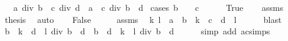 \begin{isabellebody}
\ \ \ {\isachardoublequoteopen}{\isacharparenleft}{\kern0pt}a\ div\ b{\isacharparenright}{\kern0pt}\ {\isacharasterisk}{\kern0pt}\ {\isacharparenleft}{\kern0pt}c\ div\ d{\isacharparenright}{\kern0pt}\ {\isacharequal}{\kern0pt}\ {\isacharparenleft}{\kern0pt}a\ {\isacharasterisk}{\kern0pt}\ c{\isacharparenright}{\kern0pt}\ div\ {\isacharparenleft}{\kern0pt}b\ {\isacharasterisk}{\kern0pt}\ d{\isacharparenright}{\kern0pt}{\isachardoublequoteclose}\isanewline
%
\isadelimproof
%
\endisadelimproof
%
\isatagproof
{}\isamarkupfalse%
\ {\isacharparenleft}{\kern0pt}cases\ {\isachardoublequoteopen}b\ {\isacharequal}{\kern0pt}\ {}\ {\isasymor}\ c\ {\isacharequal}{\kern0pt}\ {}{\isachardoublequoteclose}{\isacharparenright}{\kern0pt}\isanewline
\ \ \isamarkupfalse%
\ True\isanewline
\ \ \isamarkupfalse%
\ assms\ \isamarkupfalse%
\ {\isacharquery}{\kern0pt}thesis\ \isamarkupfalse%
\ auto\isanewline
{}\isamarkupfalse%
\isanewline
\ \ \isamarkupfalse%
\ False\isanewline
\ \ \isamarkupfalse%
\ \isamarkupfalse%
\ assms\ \isamarkupfalse%
\ k\ l\ \ {\isachardoublequoteopen}a\ {\isacharequal}{\kern0pt}\ b\ {\isacharasterisk}{\kern0pt}\ k{\isachardoublequoteclose}\ \ {\isachardoublequoteopen}c\ {\isacharequal}{\kern0pt}\ d\ {\isacharasterisk}{\kern0pt}\ l{\isachardoublequoteclose}\isanewline
\ \ \ \ \isamarkupfalse%
\ blast\isanewline
\ \ \isamarkupfalse%
\ \isamarkupfalse%
\ {\isachardoublequoteopen}b\ {\isacharasterisk}{\kern0pt}\ k\ {\isacharasterisk}{\kern0pt}\ {\isacharparenleft}{\kern0pt}d\ {\isacharasterisk}{\kern0pt}\ l{\isacharparenright}{\kern0pt}\ div\ {\isacharparenleft}{\kern0pt}b\ {\isacharasterisk}{\kern0pt}\ d{\isacharparenright}{\kern0pt}\ {\isacharequal}{\kern0pt}\ {\isacharparenleft}{\kern0pt}b\ {\isacharasterisk}{\kern0pt}\ d{\isacharparenright}{\kern0pt}\ {\isacharasterisk}{\kern0pt}\ {\isacharparenleft}{\kern0pt}k\ {\isacharasterisk}{\kern0pt}\ l{\isacharparenright}{\kern0pt}\ div\ {\isacharparenleft}{\kern0pt}b\ {\isacharasterisk}{\kern0pt}\ d{\isacharparenright}{\kern0pt}{\isachardoublequoteclose}\isanewline
\ \ \ \ \isamarkupfalse%
\ {\isacharparenleft}{\kern0pt}simp\ add{\isacharcolon}{\kern0pt}\ ac{\isacharunderscore}{\kern0pt}simps{\isacharparenright}{\kern0pt}\isanewline
\ \ \isamarkupfalse%
\ \isamarkupfalse%

\end{isabellebody}
